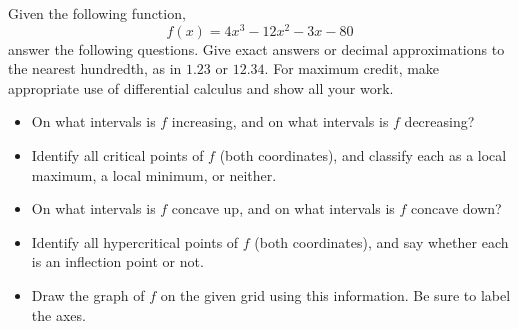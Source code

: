 \GraphingGrid

\newpage

Given the following function,
\begin{equation*}
 f(x) = 4x^3 - 12x^2 - 3x - 80
\end{equation*}
answer the following questions.
Give exact answers or decimal approximations to the nearest hundredth, as in $1.23$ or $12.34$.
For maximum credit, make appropriate use of differential calculus and show all your work.

\begin{itemize}
\item On what intervals is $f$ increasing, and on what intervals is $f$ decreasing?
\item Identify all critical points of $f$ (both coordinates), and classify each as a local maximum, a local minimum, or neither.
\item On what intervals is $f$ concave up, and on what intervals is $f$ concave down?
\item Identify all hypercritical points of $f$ (both coordinates), and say whether each is an inflection point or not.
\item Draw the graph of $f$ on the given grid using this information.
 Be sure to label the axes.
\end{itemize}

\newpage
\GraphingGrid

